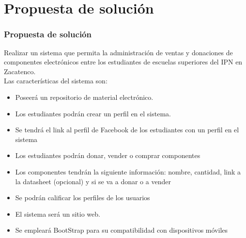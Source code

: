 \documentclass{beamer}
\begin{document}


\section{Propuesta de solución}

\begin{frame}
\frametitle{Propuesta de solución}
Realizar un sistema que permita la administración de ventas y donaciones de componentes electrónicos entre los estudiantes de escuelas superiores del IPN en Zacatenco.\\

Las características del sistema son:
\begin{itemize}
\item  Poseerá un repositorio de material electrónico.
\item Los estudiantes podrán crear un perfil en el sistema.
\item  Se tendrá el link al perfil de Facebook de los estudiantes con un perfil en el sistema
\item Los estudiantes podrán donar, vender o comprar componentes
\item  Los componentes tendrán la siguiente información: nombre, cantidad, link a la datasheet (opcional) y si se va a donar o a vender
\item  Se podrán calificar los perfiles de los usuarios
\item  El sistema será un sitio web.
\item Se empleará BootStrap para su compatibilidad con dispositivos móviles
\end{itemize}
\end{frame}
\end{document}

